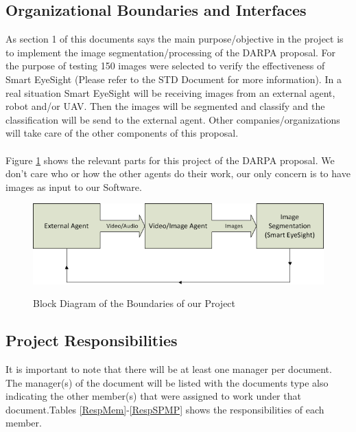 \documentclass[12pt]{article}
\begin{document}
\subsection{Organizational Boundaries and Interfaces}
As section 1 of this documents says the main purpose/objective in the project is to implement the image segmentation/processing of the DARPA proposal. For the purpose of testing 150 images were selected to verify the effectiveness of Smart EyeSight (Please refer to the STD Document for more information). In a real situation Smart EyeSight will be receiving images from an external agent, robot and/or UAV. Then the images will be segmented and classify and the classification will be send to the external agent. Other companies/organizations will take care of the other components of this proposal.\\\\
Figure \ref{boundaries} shows the relevant parts for this project of the DARPA proposal. We don't care who or how the other agents do their work, our only concern is to have images as input to our Software.

\begin{figure}[H]\centering
  \includegraphics[width=6.0in]{boundaries}\\
  \caption{Block Diagram of the Boundaries of our Project}\label{boundaries}
  \end{figure}

\subsection{Project Responsibilities}
It is important to note that there will be at least one manager per document. The manager(s) of the document will be listed with the documents type also indicating the other member(s) that were assigned to work under that document.Tables \ref{RespMem}-\ref{RespSPMP} shows the responsibilities of each member.
\end{document}

